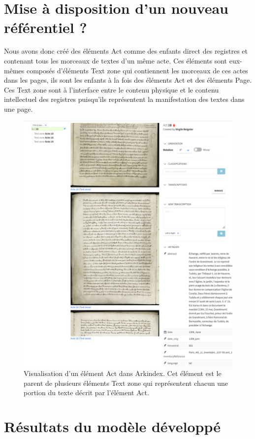 \documentclass[a4paper,12pt,twoside]{book}
\begin{document}
	\chapter{Mise à disposition d'un nouveau référentiel ?}
	
	Nous avons donc créé des éléments \og Act\fg{} comme des enfants direct des registres et contenant tous les morceaux de textes d'un même acte. Ces éléments sont eux-mêmes composés d'éléments \og Text zone\fg{} qui contiennent les morceaux de ces actes dans les pages, ils sont les enfants à la fois des éléments \og Act\fg{} et des éléments \og Page\fg{}. Ces \og Text zone\fg{} sont à l'interface entre le contenu physique et le contenu intellectuel des registres puisqu'ils représentent la manifestation des textes dans une page.
	
	\begin{figure}
		\centering
		\includegraphics[width=12cm]{Images/Act_on_Arkindex.png}
		\caption{Visualisation d'un élément \og Act\fg{} dans Arkindex. Cet élément est le parent de plusieurs éléments \og Text zone\fg{} qui représentent chacun une portion du texte décrit par l'élément \og Act\fg{}.}
		\label{Act_on_Arkindex}
	\end{figure}
	
	\chapter{Résultats du modèle développé}
	
\end{document}

